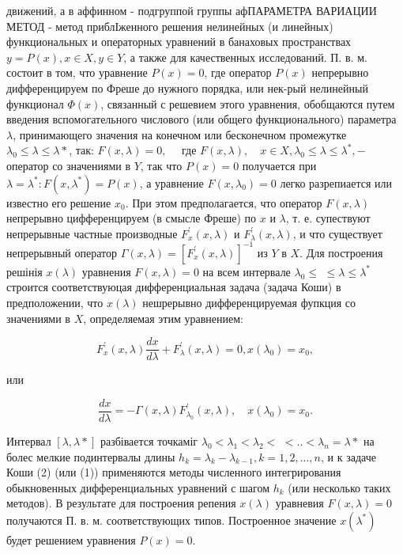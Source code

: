 \documentclass[10pt]{article}
\begin{document}
движений, а в аффинном - подгруппой группы афПАРАМЕТРА ВАРИАЦИИ МЕТОД - метод приблІженного решения нелинейных (и линейных) функциональных и операторных уравнений в банаховых пространствах $y=P(x), x \in X, y \in Y$, а также для качественных исследований. П. в. м. состоит в том, что уравнение $P(x)=0$, где оператор $P(x)$ непрерывно дифференцируем по Фреше до нужного порядка, или нек-рый нелинейный функционал $\Phi(x)$, связанный с решевием этого уравнения, обобщаются путем введения вспомогательного числового (или общего функционального) параметра $\lambda$, принимающего значения на конечном или бесконечном промежутке $\lambda_{0} \leqslant \lambda \leqslant \lambda *$, так: $F(x, \lambda)=0, \quad$ где $F(x, \lambda), \quad x \in X, \lambda_{0} \leqslant \lambda \leqslant \lambda^{*},-$ оператор со значениями в $Y$, так что $P(x)=0$ получается при $\lambda=\lambda^{*}: F\left(x, \lambda^{*}\right)=P(x)$, а уравнение $F\left(x, \lambda_{0}\right)=0$ легко разрепиается или известно его решение $x_{0}$. При этом предполагается, что оператор $F(x, \lambda)$ непрерывно цифференцируем (в смысле Фреше) по $x$ и $\lambda$, т. е. супествуют непрерывные частные производные $F_{x}^{\prime}(x, \lambda)$ и $F_{\lambda}^{\prime}(x, \lambda)$, и что существует непрерывный оператор $\Gamma(x, \lambda)=\left[F_{x}^{\prime}(x, \lambda)\right]^{-1}$ из $Y$ в $X$. Для построения решінія $x(\lambda)$ уравнения $F(x, \lambda)=0$ на всем интервале $\lambda_{0} \leqslant$ $\leqslant \lambda \leqslant \lambda^{*}$ строится соответствуюцая дифференциальная задача (задача Коши) в предположении, что $x(\lambda)$ нешрерывно дифференцируемая фупкция со значениями в $X$, определяемая этим уравнением:



\[

F_{x}^{\prime}(x, \lambda) \frac{d x}{d \lambda}+F_{\lambda}^{\prime}(x, \lambda)=0, x\left(\lambda_{0}\right)=x_{0},

\]



или



\[

\frac{d x}{d \lambda}=-\Gamma(x, \lambda) F_{\lambda_{0}}^{\prime}(x, \lambda), \quad x\left(\lambda_{0}\right)=x_{0} .

\]



Интервал $[\lambda, \lambda *]$ разбівается точкаміг $\lambda_{0}<\lambda_{1}<\lambda_{2}<$ $<. .<\lambda_{n}=\lambda *$ на болес мелкие подинтервалы длины $h_{k}=\lambda_{k}-\lambda_{k-1}, k=1,2, \ldots, n$, и к задаче Коши (2) (или (1)) применяются методы численного интегрирования обыкновенных дифференциальных уравнений с шагом $h_{k}$ (или несколько таких методов). В результате для построения репения $x(\lambda)$ уравневия $F(x, \lambda)=0$ получаются П. в. м. соответствующих типов. Построенное значение $x\left(\lambda^{*}\right)$ будет решением уравнения $P(x)=0$.
\end{document}
